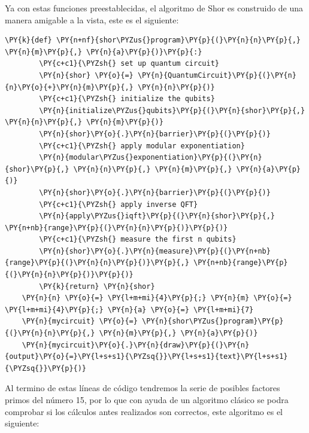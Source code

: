 Ya con estas funciones preestablecidas, el algoritmo de Shor es construido de una manera amigable a la vista, este es el siguiente:
\begin{tcolorbox}[breakable, size=fbox, boxrule=1pt, pad at break*=1mm,colback=cellbackground, colframe=cellborder]
    \begin{Verbatim}[commandchars=\\\{\}]
    \PY{k}{def} \PY{n+nf}{shor\PYZus{}program}\PY{p}{(}\PY{n}{n}\PY{p}{,} \PY{n}{m}\PY{p}{,} \PY{n}{a}\PY{p}{)}\PY{p}{:}
        \PY{c+c1}{\PYZsh{} set up quantum circuit}
        \PY{n}{shor} \PY{o}{=} \PY{n}{QuantumCircuit}\PY{p}{(}\PY{n}{n}\PY{o}{+}\PY{n}{m}\PY{p}{,} \PY{n}{n}\PY{p}{)}
        \PY{c+c1}{\PYZsh{} initialize the qubits}
        \PY{n}{initialize\PYZus{}qubits}\PY{p}{(}\PY{n}{shor}\PY{p}{,} \PY{n}{n}\PY{p}{,} \PY{n}{m}\PY{p}{)}
        \PY{n}{shor}\PY{o}{.}\PY{n}{barrier}\PY{p}{(}\PY{p}{)}
        \PY{c+c1}{\PYZsh{} apply modular exponentiation}
        \PY{n}{modular\PYZus{}exponentiation}\PY{p}{(}\PY{n}{shor}\PY{p}{,} \PY{n}{n}\PY{p}{,} \PY{n}{m}\PY{p}{,} \PY{n}{a}\PY{p}{)}
        \PY{n}{shor}\PY{o}{.}\PY{n}{barrier}\PY{p}{(}\PY{p}{)}
        \PY{c+c1}{\PYZsh{} apply inverse QFT}
        \PY{n}{apply\PYZus{}iqft}\PY{p}{(}\PY{n}{shor}\PY{p}{,} \PY{n+nb}{range}\PY{p}{(}\PY{n}{n}\PY{p}{)}\PY{p}{)}
        \PY{c+c1}{\PYZsh{} measure the first n qubits}
        \PY{n}{shor}\PY{o}{.}\PY{n}{measure}\PY{p}{(}\PY{n+nb}{range}\PY{p}{(}\PY{n}{n}\PY{p}{)}\PY{p}{,} \PY{n+nb}{range}\PY{p}{(}\PY{n}{n}\PY{p}{)}\PY{p}{)}
        \PY{k}{return} \PY{n}{shor}
    \PY{n}{n} \PY{o}{=} \PY{l+m+mi}{4}\PY{p}{;} \PY{n}{m} \PY{o}{=} \PY{l+m+mi}{4}\PY{p}{;} \PY{n}{a} \PY{o}{=} \PY{l+m+mi}{7}
    \PY{n}{mycircuit} \PY{o}{=} \PY{n}{shor\PYZus{}program}\PY{p}{(}\PY{n}{n}\PY{p}{,} \PY{n}{m}\PY{p}{,} \PY{n}{a}\PY{p}{)}
    \PY{n}{mycircuit}\PY{o}{.}\PY{n}{draw}\PY{p}{(}\PY{n}{output}\PY{o}{=}\PY{l+s+s1}{\PYZsq{}}\PY{l+s+s1}{text}\PY{l+s+s1}{\PYZsq{}}\PY{p}{)}
    \end{Verbatim}
    \end{tcolorbox}
Al termino de estas líneas de código tendremos la serie de posibles factores primos del número 15, por lo que con ayuda de un algoritmo clásico se podra comprobar si los cálculos 
antes realizados son correctos, este algoritmo es el siguiente:
